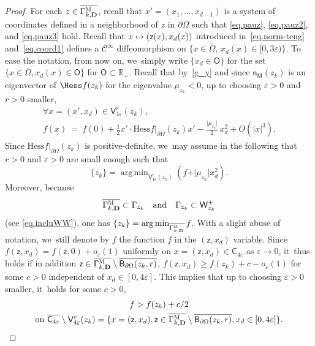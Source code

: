 \documentclass[10pt]{amsart}
\newcommand\mto{\mathchoice{\longmapsto}{\mapsto}{\mapsto}{\mapsto}}
\newcommand{\quand}{\quad\text{and}\quad}
\newcommand{\mbf}[1]{\mathbf{#1}}
\let\ve\varepsilon
\DeclareMathOperator*{\argmin}{arg\,min}
\theoremstyle{plain}
\theoremstyle{definition}
\begin{document}
\begin{proof}
For each $z\in \overline{ \Gamma_{k,\mbf D}^{\textsc{M}}}$, recall
that $x'=(x_1,\ldots,x_{d-1})$ is a system of coordinates defined
in a neighborhood of $z$ in $\partial \Omega$ such that
\eqref{eq.pauz}, \eqref{eq.pauz2}, and \eqref{eq.pauz3} hold. Recall
that $x\mto (\mathsf z(x),x_d(x))$ introduced
in~\eqref{eq.norm-teng} and~\eqref{eq.coord1} defines a $\mathcal C^\infty$ diffeomorphism on $\{x\in\overline\Omega,\, x_d(x)\in [0,3\ve)\}$. To ease the notation, from now on, we~simply write $\{ x_d \in \mathsf O\}$ for the set $\{x\in \overline \Omega, x_d(x) \in \mathsf O\}$ for $\mathsf O\subset \mathbb R_+$.
Recall that by~\eqref{g_y} and since $\mathsf n_{\mathsf M}(z_k)$ is an eigenvector of $\Hess f(z_k)$ for the eigenvalue $\mu_{z_k}<0$,
up to choosing $\ve>0$ and $r>0$ smaller,\vspace*{-4pt}
\begin{multline}\label{eq.DLzk}
\forall x=(x',x_d)\in \mathsf V_{4\ve}^r(z_k), \\ f(x)\ =\ f(0)+ \frac 12 x' \cdot \text{Hess} f|_{\partial \Omega} (z_k)x' - \frac{\vert \mu_{z_k}\vert }{2}\, x_d^2 + O(\vert x\vert^3).
\end{multline}
Since $\text{Hess} f|_{\partial \Omega} (z_k)$ is positive-definite, we~may assume in the following that $r>0$ and $\ve>0$ are small enough such that\vspace*{-3pt}
\begin{equation}\label{eq.min-zK}
\{z_k\}=\argmin_{ { \mathsf V_{4\ve}^r(z_k)}} (f+ \vert \mu_{z_k} \vert x_d^2).
\end{equation}
Moreover, because\vspace*{-4pt}
\[
\overline{ \Gamma_{k,\mbf D}^{\textsc{M}}}\subset \Gamma_{z_k}\quand \Gamma_{z_k}\subset \mathsf W_{z_k}^+
\]
(see \eqref{eq.incluWW}), one has
$\{z_k\}=\argmin_{\overline{ \Gamma_{k,\mbf D}^{\textsc{M}}}}f$.
With a slight abuse of notation, we~still denote by $f$ the function $f$ in the $(\mathsf z,x_d)$ variable.
Since $f(\mathsf z,x_d)= f(\mathsf z,0)+o_{\ve}(1)$ uniformly on $x=(\mathsf z,x_d)\in \overline{\mathsf C_{4\ve}}$ as $\ve \to 0$, it~thus holds if in addition $\mathsf z\in \overline{ \Gamma_{k,\mbf D}^{\textsc{M}}}\setminus \overline{\mathsf B_{\partial \Omega}(z_k,r)}$, $f(\mathsf z,x_d)\ge f(z_k)+c-o_{\ve}(1)$ for some $c>0$ independent of $x_d\in [0,4\ve]$. This implies that up to choosing $\ve >0$ smaller, it~holds for some $c>0$,
\begin{multline}\label{eq.min>>zK}
f> f(z_k)+c/2\\ \text{on}\ \overline{\mathsf C_{4\ve}}\setminus \mathsf V_{4\ve}^r(z_k)=\{x=(\mathsf z,x_d), \mathsf z\in \overline{ \Gamma_{k,\mbf D}^{\textsc{M}}}\setminus \overline{\mathsf B_{\partial \Omega}(z_k,r)}, x_d\in [0,4\ve]\}.
\end{multline}


\end{proof}
\end{document}
